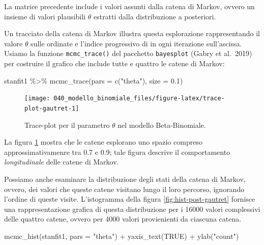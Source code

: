 \documentclass[
  11pt,
  italian,
  a4paper,
  extrafontsizes,onecolumn,openright
  ]{memoir}
\newenvironment{Shaded}{\begin{snugshade}}{\end{snugshade}}
\newcommand{\AttributeTok}[1]{\textcolor[rgb]{0.77,0.63,0.00}{#1}}
\newcommand{\ConstantTok}[1]{\textcolor[rgb]{0.00,0.00,0.00}{#1}}
\newcommand{\FloatTok}[1]{\textcolor[rgb]{0.00,0.00,0.81}{#1}}
\newcommand{\FunctionTok}[1]{\textcolor[rgb]{0.00,0.00,0.00}{#1}}
\newcommand{\NormalTok}[1]{#1}
\newcommand{\SpecialCharTok}[1]{\textcolor[rgb]{0.00,0.00,0.00}{#1}}
\newcommand{\StringTok}[1]{\textcolor[rgb]{0.31,0.60,0.02}{#1}}
\begin{document}
\noindent
La matrice precedente include i valori assunti dalla catena di Markov, ovvero un insieme di valori plausibili \(\theta\) estratti dalla distribuzione a posteriori.

Un tracciato della catena di Markov illustra questa esplorazione rappresentando il valore \(\theta\) sulle ordinate e l'indice progressivo di in ogni iterazione sull'ascissa. Usiamo la funzione \texttt{mcmc\_trace()} del pacchetto \texttt{bayesplot} (Gabry et al.~2019) per costruire il grafico che include tutte e quattro le catene di Markov:

\begin{Shaded}
\begin{Highlighting}[]
\NormalTok{stanfit1 }\SpecialCharTok{\%\textgreater{}\%}
  \FunctionTok{mcmc\_trace}\NormalTok{(}\AttributeTok{pars =} \FunctionTok{c}\NormalTok{(}\StringTok{"theta"}\NormalTok{), }\AttributeTok{size =} \FloatTok{0.1}\NormalTok{)}
\end{Highlighting}
\end{Shaded}

\begin{figure}

{\centering \texttt{[image: 040\_modello\_binomiale\_files/figure-latex/trace-plot-gautret-1]} 

}

\caption{Trace-plot per il parametro $\theta$ nel modello Beta-Binomiale.}\label{fig:trace-plot-gautret}
\end{figure}

\noindent
La figura \ref{fig:trace-plot-gautret} mostra che le catene esplorano uno spazio compreso approssimativamenre tra 0.7 e 0.9; tale figura descrive il comportamento \emph{longitudinale} delle catene di Markov.

Possiamo anche esaminare la distribuzione degli stati della catena di Markov, ovvero, dei valori che queste catene visitano lungo il loro percorso, ignorando l'ordine di queste visite. L'istogramma della figura \ref{fig:hist-post-gautret} fornisce una rappresentazione grafica di questa distribuzione per i 16000 valori complessivi delle quattro catene, ovvero per 4000 valori provienienti da ciascuna catena.

\begin{Shaded}
\begin{Highlighting}[]
\FunctionTok{mcmc\_hist}\NormalTok{(stanfit1, }\AttributeTok{pars =} \StringTok{"theta"}\NormalTok{) }\SpecialCharTok{+}
  \FunctionTok{yaxis\_text}\NormalTok{(}\ConstantTok{TRUE}\NormalTok{) }\SpecialCharTok{+}
  \FunctionTok{ylab}\NormalTok{(}\StringTok{"count"}\NormalTok{)}
\end{Highlighting}
\end{Shaded}
\end{document}
